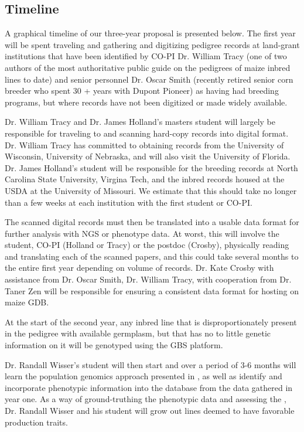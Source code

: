 \documentclass[12pt]{article}
\begin{document}
\subsection*{Timeline}
A graphical timeline of our three-year proposal is presented below.
The first year will be spent traveling and gathering and digitizing pedigree records at land-grant institutions that have been identified by CO-PI Dr. William Tracy (one of two authors of the most authoritative public guide on the pedigrees of maize inbred lines to date) and senior personnel Dr. Oscar Smith (recently retired senior corn breeder who spent 30 + years with Dupont Pioneer) as having had breeding programs, but where records have not been digitized or made widely available. 
\par Dr. William Tracy and Dr. James Holland's masters student will largely be responsible for traveling to and scanning hard-copy records into digital format. Dr. William Tracy has committed to obtaining records from the University of Wisconsin, University of Nebraska, and will also visit the University of Florida. Dr. James Holland's student will be responsible for the breeding records at North Carolina State University, Virgina Tech, and the inbred records housed at the USDA at the University of Missouri. We estimate that this should take no longer than a few weeks at each institution with the first student or CO-PI. 
\par The scanned digital records must then be translated into a usable data format for further analysis with NGS or phenotype data. At worst, this will involve the student, CO-PI (Holland or Tracy) or the postdoc (Crosby), physically reading and translating each of the scanned papers, and this could take several months to the entire first year depending on volume of records. Dr. Kate Crosby with assistance from Dr. Oscar Smith, Dr. William Tracy, with cooperation from Dr. Taner Zen will be responsible for ensuring a consistent data format for hosting on maize GDB.
\par At the start of the second year, any inbred line that is disproportionately present in the pedigree with available germplasm, but that has no to little genetic information on it will be genotyped using the GBS platform. 
\par
Dr. Randall Wisser's student will then start and over a period of 3-6 months will learn the population genomics approach presented in \citep{Berg:2014bs}, as well as identify and incorporate phenotypic information into the database from the data gathered in year one. As a way of ground-truthing the phenotypic data and assessing the , Dr. Randall Wisser and his student will grow out lines deemed to have favorable production traits.





\end{document}
